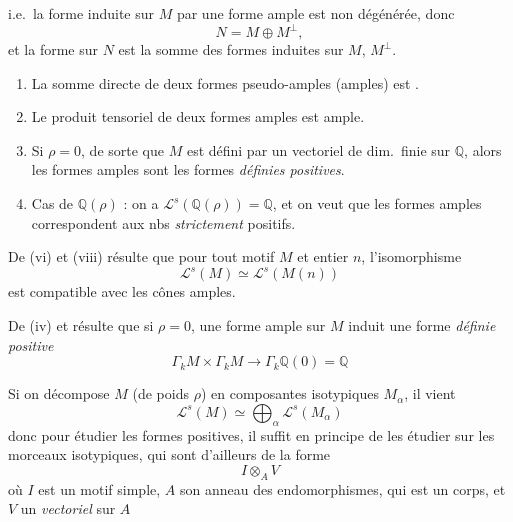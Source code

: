 \documentclass[11pt,a4paper]{article}
\begin{document}
\struck{\ill{}} i.e.\ la forme induite sur $M$ par une forme ample est
non dégénérée, donc
\[
  N = M \oplus M^{\perp} ,
\]
et la forme sur $N$ est la somme des formes induites sur $M$, $M^{\perp}$.

\begin{enumerate}
  \item[(v)] La somme directe de deux formes 
  pseudo-amples (amples) est .
  \item[(vi)] Le produit tensoriel de deux formes amples est ample.
  \item[(vii)] Si $\rho = 0$, de sorte que  $M$ est
  défini par un vectoriel de dim.\ finie sur $\mathbb{Q}$, alors les formes
  amples sont les formes \emph{définies positives}. 
  \item[(viii)] Cas de $\mathbb{Q}(\rho)$ : on a $\mathcal{L}^{s}(\mathbb{Q}(\rho))
  = \mathbb{Q}$, et on veut que les formes amples correspondent aux nbs
  \emph{strictement} positifs.
\end{enumerate}

De (vi) et (viii) résulte que pour tout motif $M$ et entier $n$,
l'isomorphisme
\[
  \mathcal{L}^{s}(M) \simeq \mathcal{L}^{s}(M(n))
\]
est compatible avec les cônes amples.

De (iv) et  résulte que si $\rho = 0$, une forme ample sur $M$
induit une forme \emph{définie positive}
\[
  \Gamma_{k} M \times \Gamma_{k} M \longrightarrow \Gamma_{k} \mathbb{Q}(0) = \mathbb{Q}
\]

Si on décompose $M$ (de poids $\rho$) en composantes isotypiques
$M_{\alpha}$, il vient
\[
  \mathcal{L}^{s}(M) \simeq \bigoplus_{\alpha} \mathcal{L}^{s}(M_{\alpha})
\]
donc pour étudier les formes positives, il suffit en principe de les étudier
sur les morceaux isotypiques, qui sont d'ailleurs de la forme
\[
  I \otimes_{A} V
\]
où $I$ est un motif simple, $A$ son anneau des endomorphismes, qui est un
corps, et $V$ un \emph{vectoriel} sur $A$
\end{document}
